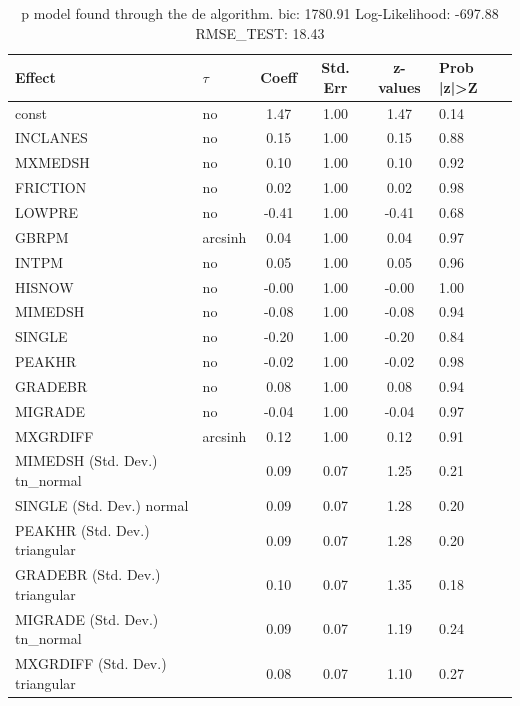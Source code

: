 \begin{table}
	\caption{p model found through the de algorithm. bic: 1780.91 Log-Likelihood: -697.88 RMSE_TEST: 18.43}
	\begin{center}
		\begin{tabular}{|l|l|c|c|c|l|}
			\hline
			Effect & $\tau$ & Coeff & Std. Err & z-values & Prob |z|>Z \\
			\hline
			const & no & 1.47 & 1.00 & 1.47 & 0.14 \\
			\hline
			INCLANES & no & 0.15 & 1.00 & 0.15 & 0.88 \\
			\hline
			MXMEDSH & no & 0.10 & 1.00 & 0.10 & 0.92 \\
			\hline
			FRICTION & no & 0.02 & 1.00 & 0.02 & 0.98 \\
			\hline
			LOWPRE & no & -0.41 & 1.00 & -0.41 & 0.68 \\
			\hline
			GBRPM & arcsinh & 0.04 & 1.00 & 0.04 & 0.97 \\
			\hline
			INTPM & no & 0.05 & 1.00 & 0.05 & 0.96 \\
			\hline
			HISNOW & no & -0.00 & 1.00 & -0.00 & 1.00 \\
			\hline
			MIMEDSH & no & -0.08 & 1.00 & -0.08 & 0.94 \\
			\hline
			SINGLE & no & -0.20 & 1.00 & -0.20 & 0.84 \\
			\hline
			PEAKHR & no & -0.02 & 1.00 & -0.02 & 0.98 \\
			\hline
			GRADEBR & no & 0.08 & 1.00 & 0.08 & 0.94 \\
			\hline
			MIGRADE & no & -0.04 & 1.00 & -0.04 & 0.97 \\
			\hline
			MXGRDIFF & arcsinh & 0.12 & 1.00 & 0.12 & 0.91 \\
			\hline
			MIMEDSH (Std. Dev.) tn_normal &  & 0.09 & 0.07 & 1.25 & 0.21 \\
			\hline
			SINGLE (Std. Dev.) normal &  & 0.09 & 0.07 & 1.28 & 0.20 \\
			\hline
			PEAKHR (Std. Dev.) triangular &  & 0.09 & 0.07 & 1.28 & 0.20 \\
			\hline
			GRADEBR (Std. Dev.) triangular &  & 0.10 & 0.07 & 1.35 & 0.18 \\
			\hline
			MIGRADE (Std. Dev.) tn_normal &  & 0.09 & 0.07 & 1.19 & 0.24 \\
			\hline
			MXGRDIFF (Std. Dev.) triangular &  & 0.08 & 0.07 & 1.10 & 0.27 \\
			\hline
		\end{tabular}
	\end{center}
\end{table}